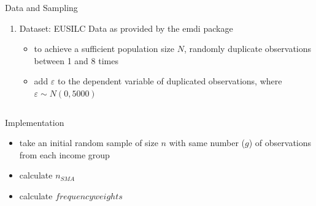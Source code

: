 \documentclass[fleqn,final]{beamer}
\newcommand{\Pheight}{\rule[-5mm]{0cm}{1cm}}
\begin{document}
\begin{frame}
\begin{columns}[t]
\begin{column}{.3\linewidth}
\begin{block}{Data and Sampling \Pheight}
\begin{enumerate}
\begin{itemize}
\item approach is generalizable to other forms of sampling, where certain groups are over- or undersampled in a stratified setting
\end{itemize} 

 \item Dataset: EUSILC Data as provided by the emdi package
\begin{itemize}

\item to achieve a sufficient population size $N$, randomly duplicate observations between 1 and 8 times
\item add $\varepsilon$ to the dependent variable of duplicated observations, where  $\varepsilon \sim N(0,5000)$
\end{itemize} 
\end{enumerate}

\end{block}
\end{column} 



%
%
  
\end{columns}  



\begin{columns}[t]

%



\begin{column}{.3\linewidth}


\begin{block}{Implementation \Pheight}
\begin{itemize}

\item take an initial random sample of size $n$ with same number ($g$) of observations from each income group 
\item calculate $n_{SMA}$
\item calculate $frequency weights$
 

\end{itemize}
\end{block}
\end{column}
\end{columns}
\end{frame}
\end{document}
